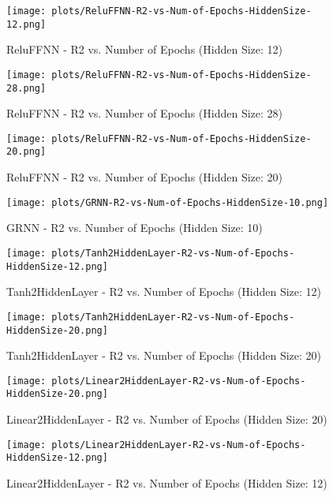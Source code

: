 \begin{figure}[H]
    \centering
    \texttt{[image: plots/ReluFFNN-R2-vs-Num-of-Epochs-HiddenSize-12.png]}
    \caption{ReluFFNN - R2 vs. Number of Epochs (Hidden Size: 12)}
\end{figure}

\begin{figure}[H]
    \centering
    \texttt{[image: plots/ReluFFNN-R2-vs-Num-of-Epochs-HiddenSize-28.png]}
    \caption{ReluFFNN - R2 vs. Number of Epochs (Hidden Size: 28)}
\end{figure}

\begin{figure}[H]
    \centering
    \texttt{[image: plots/ReluFFNN-R2-vs-Num-of-Epochs-HiddenSize-20.png]}
    \caption{ReluFFNN - R2 vs. Number of Epochs (Hidden Size: 20)}
\end{figure}

\begin{figure}[H]
    \centering
    \texttt{[image: plots/GRNN-R2-vs-Num-of-Epochs-HiddenSize-10.png]}
    \caption{GRNN - R2 vs. Number of Epochs (Hidden Size: 10)}
\end{figure}

\begin{figure}[H]
    \centering
    \texttt{[image: plots/Tanh2HiddenLayer-R2-vs-Num-of-Epochs-HiddenSize-12.png]}
    \caption{Tanh2HiddenLayer - R2 vs. Number of Epochs (Hidden Size: 12)}
\end{figure}

\begin{figure}[H]
    \centering
    \texttt{[image: plots/Tanh2HiddenLayer-R2-vs-Num-of-Epochs-HiddenSize-20.png]}
    \caption{Tanh2HiddenLayer - R2 vs. Number of Epochs (Hidden Size: 20)}
\end{figure}

\begin{figure}[H]
    \centering
    \texttt{[image: plots/Linear2HiddenLayer-R2-vs-Num-of-Epochs-HiddenSize-20.png]}
    \caption{Linear2HiddenLayer - R2 vs. Number of Epochs (Hidden Size: 20)}
\end{figure}

\begin{figure}[H]
    \centering
    \texttt{[image: plots/Linear2HiddenLayer-R2-vs-Num-of-Epochs-HiddenSize-12.png]}
    \caption{Linear2HiddenLayer - R2 vs. Number of Epochs (Hidden Size: 12)}
\end{figure}

